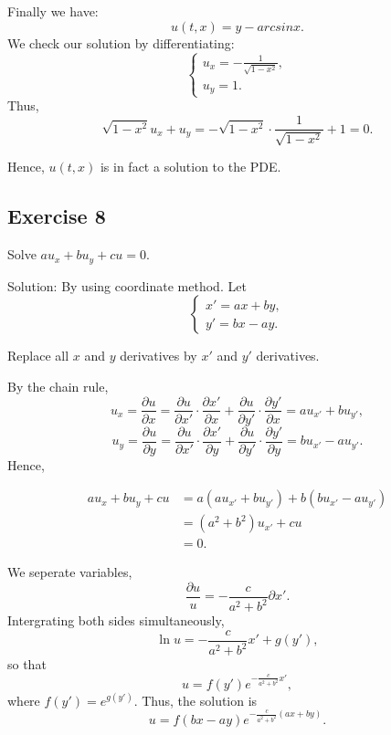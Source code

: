 \documentclass{article}
\begin{document}
			Finally we have:
			\[u(t,x)=y - arcsinx.\]
			We check our solution by differentiating:
			\begin{equation*}
				\begin{cases}
					u_x=-\frac{1}{\sqrt{1-x^2}},
					\\
					u_y=1.
				\end{cases}
			\end{equation*}
			Thus, \[\sqrt{1-x^2}u_x+u_y=-\sqrt{1-x^2} \cdot \frac{1}{\sqrt{1-x^2}}+1=0.\]

			Hence, $u(t,x)$ is in fact a solution to the PDE.


		\subsection{Exercise 8}
		Solve $au_x+bu_y+cu=0.$
		
		Solution:
		By using coordinate method. Let 
		\begin{equation*}
			\begin{cases}
				x'=ax+by,
				\\
				y'=bx-ay.
			\end{cases}
		\end{equation*}

		Replace all $x$ and $y$ derivatives by $x'$ and $y'$ derivatives.

		By the chain rule, \[u_x=\frac{\partial u}{\partial x}=\frac{\partial u}{\partial x'}\cdot\frac{\partial x'}{\partial x}+\frac{\partial u}{\partial y'}\cdot\frac{\partial y'}{\partial x}=au_{x'}+bu_{y'},\]
		\[u_y=\frac{\partial u}{\partial y}=\frac{\partial u}{\partial x'}\cdot\frac{\partial x'}{\partial y}+\frac{\partial u}{\partial y'}\cdot\frac{\partial y'}{\partial y}=bu_{x'}-au_{y'}.\]
		Hence,

		\begin{equation*}
			\begin{aligned}
			au_x+bu_y+cu&=
			a\left(au_{x'}+bu_{y'} \right)+b\left(bu_{x'}-au_{y'}\right)\\
			&=\left(a^2+b^2\right)u_{x'}+cu\\
			&=0.
			\end{aligned}
		\end{equation*}

		We seperate variables, \[\frac{\partial u}{u}=-\frac{c}{a^2+b^2}\partial x'.\]
		Intergrating both sides simultaneously, \[\ln u = -\frac{c}{a^2+b^2}x' +g(y'),\] so that \[ u = f(y')e^{-\frac{c}{a^2+b^2}x'}, \]
		where $f(y')=e^{g(y')}$.
		Thus, the solution is  \[ u = f(bx-ay)e^{-\frac{c}{a^2+b^2}(ax+by)}.\]
\end{document}
